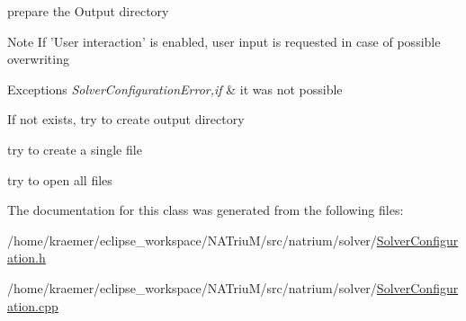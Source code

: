 prepare the Output directory 

\begin{DoxyNote}{Note}
If 'User interaction' is enabled, user input is requested in case of possible overwriting 
\end{DoxyNote}

\begin{DoxyExceptions}{Exceptions}
{\em Solver\-Configuration\-Error,if} & it was not possible \\
\hline
\end{DoxyExceptions}
If not exists, try to create output directory

try to create a single file

try to open all files 

The documentation for this class was generated from the following files\-:\begin{DoxyCompactItemize}
\item 
/home/kraemer/eclipse\-\_\-workspace/\-N\-A\-Triu\-M/src/natrium/solver/\hyperlink{SolverConfiguration_8h}{Solver\-Configuration.\-h}\item 
/home/kraemer/eclipse\-\_\-workspace/\-N\-A\-Triu\-M/src/natrium/solver/\hyperlink{SolverConfiguration_8cpp}{Solver\-Configuration.\-cpp}\end{DoxyCompactItemize}

